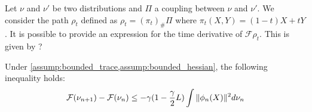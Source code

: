 Let $  \nu$ and $\nu'$ be two distributions and $\Pi$ a coupling between $\nu$ and $\nu'$. We consider the path $\rho_t$ defined as $\rho_t=(\pi_t)_{\#}\Pi$ where $\pi_t(X,Y)=(1-t)X+tY$. It is possible to provide an expression for the time derivative of $\mathcal{F}{\rho_t}$. This is given by ?\\







\begin{proposition}\label{prop:decreasing_functional}
	Under \cref{assump:bounded_trace,assump:bounded_hessian}, the following inequality holds:
	\begin{align*}
	{{\mathcal F}}(\nu_{n+1})-{{\mathcal F}}(\nu_n)\leq -\gamma (1-\frac{\gamma}{2}L )\int \Vert \phi_n(X)\Vert^2 d\nu_n
	\end{align*}
\end{proposition}

